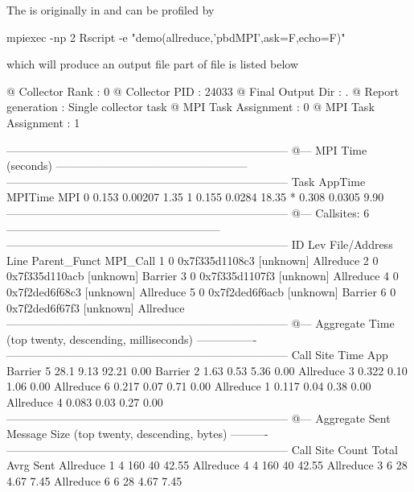 The  is originally in  and can be profiled by
\begin{Code}
mpiexec -np 2 Rscript -e "demo(allreduce,'pbdMPI',ask=F,echo=F)"
\end{Code}
which will produce an output file 
part of file is listed below
\begin{Output}
@ Collector Rank           : 0
@ Collector PID            : 24033
@ Final Output Dir         : .
@ Report generation        : Single collector task
@ MPI Task Assignment      : 0
@ MPI Task Assignment      : 1

---------------------------------------------------------------------------
@--- MPI Time (seconds) ---------------------------------------------------
---------------------------------------------------------------------------
Task   AppTime   MPITime    MPI%
0      0.153     0.00207    1.35
1      0.155     0.0284    18.35
*      0.308     0.0305     9.90
---------------------------------------------------------------------------
@--- Callsites: 6 ---------------------------------------------------------
---------------------------------------------------------------------------
ID Lev File/Address        Line Parent_Funct             MPI_Call
1   0 0x7f335d1108c3           [unknown]                Allreduce
2   0 0x7f335d110acb           [unknown]                Barrier
3   0 0x7f335d1107f3           [unknown]                Allreduce
4   0 0x7f2ded6f68c3           [unknown]                Allreduce
5   0 0x7f2ded6f6acb           [unknown]                Barrier
6   0 0x7f2ded6f67f3           [unknown]                Allreduce
---------------------------------------------------------------------------
@--- Aggregate Time (top twenty, descending, milliseconds) ----------------
---------------------------------------------------------------------------
Call                 Site       Time    App%
Barrier                 5       28.1    9.13   92.21    0.00
Barrier                 2       1.63    0.53    5.36    0.00
Allreduce               3      0.322    0.10    1.06    0.00
Allreduce               6      0.217    0.07    0.71    0.00
Allreduce               1      0.117    0.04    0.38    0.00
Allreduce               4      0.083    0.03    0.27    0.00
---------------------------------------------------------------------------
@--- Aggregate Sent Message Size (top twenty, descending, bytes) ----------
---------------------------------------------------------------------------
Call                 Site      Count      Total       Avrg  Sent%
Allreduce               1          4        160         40  42.55
Allreduce               4          4        160         40  42.55
Allreduce               3          6         28       4.67   7.45
Allreduce               6          6         28       4.67   7.45
\end{Output}


